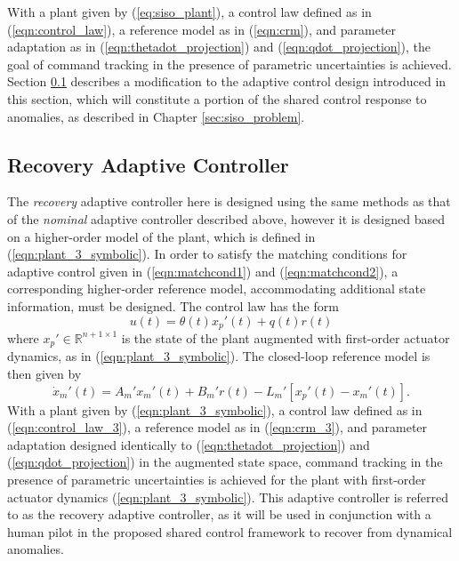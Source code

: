 With a plant given by (\ref{eq:siso_plant}), a control law defined as in (\ref{eqn:control_law}), a reference model as in (\ref{eqn:crm}), and parameter adaptation as in (\ref{eqn:thetadot_projection}) and (\ref{eqn:qdot_projection}), the goal of command tracking in the presence of parametric uncertainties is achieved. Section \ref{subsec:siso_recovery_ac} describes a modification to the adaptive control design introduced in this section, which will constitute a portion of the shared control response to anomalies, as described in Chapter \ref{sec:siso_problem}.

\subsection{Recovery Adaptive Controller} \label{subsec:siso_recovery_ac}
The \textit{recovery} adaptive controller here is designed using the same methods as that of the \textit{nominal} adaptive controller described above, however it is designed based on a higher-order model of the plant, which is defined in (\ref{eqn:plant_3_symbolic}). In order to satisfy the matching conditions for adaptive control given in (\ref{eqn:matchcond1}) and (\ref{eqn:matchcond2}), a corresponding higher-order reference model, accommodating additional state information, must be designed. The control law has the form
\begin{equation}
	u(t) = \theta(t) x_p'(t) + q(t) r(t)
	\label{eqn:control_law_3}
\end{equation}
where $x_p' \in \mathbb{R}^{n+1 \times 1}$ is the state of the plant augmented with first-order actuator dynamics, as in (\ref{eqn:plant_3_symbolic}). The closed-loop reference model is then given by
\begin{equation}
	\dot{x}_m'(t) = A_m' x_m'(t) + B_m' r(t) - L_m' \left[x_p'(t) - x_m'(t)\right].
	\label{eqn:crm_3}
\end{equation}
With a plant given by (\ref{eqn:plant_3_symbolic}), a control law defined as in (\ref{eqn:control_law_3}), a reference model as in (\ref{eqn:crm_3}), and parameter adaptation designed identically to (\ref{eqn:thetadot_projection}) and (\ref{eqn:qdot_projection}) in the augmented state space, command tracking in the presence of parametric uncertainties is achieved for the plant with first-order actuator dynamics (\ref{eqn:plant_3_symbolic}). This adaptive controller is referred to as the recovery adaptive controller, as it will be used in conjunction with a human pilot in the proposed shared control framework to recover from dynamical anomalies.

